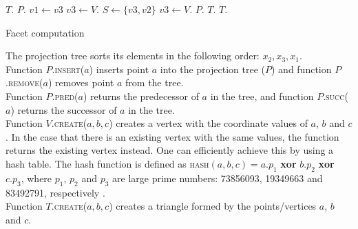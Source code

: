 \begin{algorithm}[h]
\begin{algorithmic}[1]
\State $T.$ \raisedrule{}
\State $P.$ \raisedrule{}
\State $v1 \leftarrow v3$ \raisedrule{}
\EndLoop
{} \raisedrule{}
\State $v3 \leftarrow V.$ \raisedrule{}
\State $S \leftarrow \{v3, v2\}$ \raisedrule{}
\Else \raisedrule{}
\State $v3 \leftarrow V.$ \raisedrule{}
 \raisedrule{}
\State $P.$ \raisedrule{}
\EndIf
\EndIf
\State $T.$ \raisedrule{}
\State $T.$ \raisedrule{}
\EndFunction
\end{algorithmic}
\caption{Facet computation}
\label{alg:facet_computation}
\algrule[1pt]
\small The projection tree sorts its elements in the following order: $x_2,x_3,x_1$.\\Function $P$.\textsc{insert}($a$) inserts point $a$ into the projection tree ($P$) and function $P$.\textsc{remove}($a$) removes point $a$ from the tree.\\Function $P$.\textsc{pred}($a$) returns the predecessor of $a$ in the tree, and function $P$.\textsc{succ}($a$) returns the successor of $a$ in the tree.\\Function $V$.\textsc{create}($a,b,c$) creates a vertex with the coordinate values of $a$, $b$ and $c$. In the case that there is an existing vertex with the same values, the function returns the existing vertex instead. One can efficiently achieve this by using a hash table. The hash function is defined as \textsc{hash}$(a,b,c) = a.p_1$ \textbf{xor} $b.p_2$ \textbf{xor} $c.p_3$, where $p_1$, $p_2$ and $p_3$ are large prime numbers: 73856093, 19349663 and 83492791, respectively \cite{teschner_hash}.\\Function $T$.\textsc{create}($a,b,c$) creates a triangle formed by the points/vertices $a$, $b$ and $c$.
\end{algorithm}
